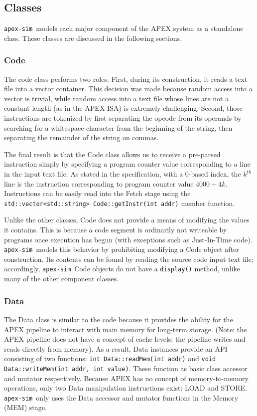 \documentclass[12pt]{article}
\newcommand{\codename}[0]{\texttt{apex-sim}~}
\begin{document}
\subsection{Classes}
\label{sec:classes}
\codename models each major component of the APEX system as a standalone class. These classes are discussed in the following sections.

\subsubsection{Code}
The code class performs two roles. 
First, during its construction, it reads a text file into a vector container. This decision was made because random access into a vector is trivial, while random access into a text file whose lines are not a constant length (as in the APEX ISA) is extremely challenging. 
Second, those instructions are tokenized by first separating the opcode from its operands by searching for a whitespace character from the beginning of the string, then separating the remainder of the string on commas. 

The final result is that the Code class allows us to receive a pre-parsed instruction simply by specifying a program counter value corresponding to a line in the input text file. 
As stated in the specification, with a 0-based index, the $k^{th}$ line is the instruction corresponding to program counter value $4000 + 4k$. 
Instructions can be easily read into the Fetch stage using the \texttt{std::vector<std::string> Code::getInstr(int addr)} member function.

Unlike the other classes, Code does not provide a means of modifying the values it contains. This is because a code segment is ordinarily not writeable by programs once execution has begun (with exceptions such as Just-In-Time code). \codename models this behavior by prohibiting modifying a Code object after construction. Its contents can be found by reading the source code input text file; accordingly, \codename Code objects do not have a \texttt{display()} method, unlike many of the other component classes.

\subsubsection{Data}
The Data class is similar to the code because it provides the ability for the APEX pipeline to interact with main memory for long-term storage.
(Note: the APEX pipeline does not have a concept of cache levels; the pipeline writes and reads directly from memory). 
As a result, Data instances provide an API consisting of two functions: \texttt{int Data::readMem(int addr)} and \texttt{void Data::writeMem(int addr, int value)}. 
These function as basic class accessor and mutator respectively.
Because APEX has no concept of memory-to-memory operations, only two Data manipulation instructions exist: LOAD and STORE.
\codename only uses the Data accessor and mutator functions in the Memory (MEM) stage.
\end{document}
